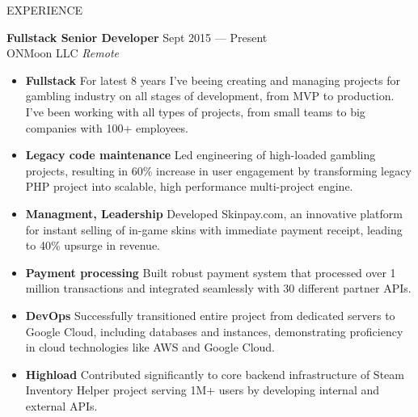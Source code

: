 \documentclass{template} %
\begin{document}
\begin{rSection}{EXPERIENCE}

\textbf{Fullstack Senior Developer} \hfill Sept 2015 --- Present\\
ONMoon LLC \hfill \textit{Remote}

\begin{minipage}{0.95\textwidth}
 \begin{itemize}
    \vspace{0.1cm}
    \itemsep 1pt {} 
    \item \textbf{Fullstack} For latest 8 years I've beeing creating and managing projects for gambling industry on all stages of development, from MVP to production. I've been working with all types of projects, from small teams to big companies with 100+ employees.
    \item \textbf{Legacy code maintenance} Led engineering of high-loaded gambling projects, resulting in 60\% increase in user
    engagement by transforming legacy PHP project into scalable, high performance multi-project engine.
    \item \textbf{Managment, Leadership} Developed Skinpay.com, an innovative platform for instant selling of in-game skins with immediate payment receipt, leading to 40\% upsurge in revenue.
    \item \textbf{Payment processing} Built robust payment system that processed over 1 million transactions and integrated seamlessly with 30 different partner APIs.
    \item \textbf{DevOps} Successfully transitioned entire project from dedicated servers to Google Cloud, including databases and instances, demonstrating proficiency in cloud technologies like AWS and Google Cloud.
    \item \textbf{Highload} Contributed significantly to core backend infrastructure of Steam Inventory Helper project serving 1M+ users by developing internal and external APIs.
 \end{itemize}
\end{minipage}

\vspace{0.5cm}


\end{rSection}
\end{document}
